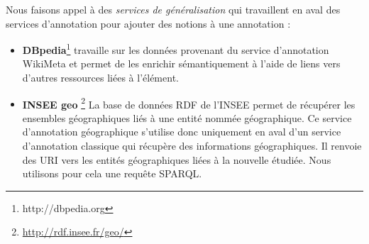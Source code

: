 \documentclass[]{easychair}
\newcommand{\comment}[4]{\par\noindent\hspace*{-0.5cm}{\parbox{\columnwidth}{\textbf{\color{#1}//#2[#3]:#4}}}\par}
\newcommand{\mi}[1]{\comment{blue}{}{#1}{MI}}
\newcommand{\ch}[1]{\comment{green}{}{#1}{CH}}
\begin{document}
Nous faisons appel à des \textit{services de généralisation} qui travaillent en aval des services d'annotation pour ajouter des notions à une annotation :
\begin{itemize}
	\item \textbf{DBpedia}\footnote{http://dbpedia.org} travaille sur les données provenant du service d'annotation WikiMeta et permet de les enrichir sémantiquement à l'aide de liens vers d'autres ressources liées à l'élément.
  \item \textbf{INSEE geo} \footnote{\url{http://rdf.insee.fr/geo/}} La base de données RDF de l'INSEE permet de récupérer les ensembles géographiques liés à une entité nommée géographique. Ce service d'annotation géographique s'utilise donc uniquement en aval d'un service d'annotation classique qui récupère des informations géographiques. Il renvoie des URI vers les entités géographiques liées à la nouvelle étudiée. Nous utilisons pour cela une requête SPARQL.
\end{itemize}


\end{document}
